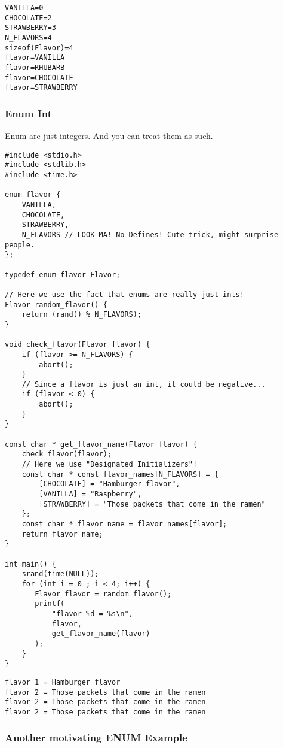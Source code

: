 \documentclass[11pt]{article}
\begin{document}
\begin{verbatim}
VANILLA=0
CHOCOLATE=2
STRAWBERRY=3
N_FLAVORS=4
sizeof(Flavor)=4
flavor=VANILLA
flavor=RHUBARB
flavor=CHOCOLATE
flavor=STRAWBERRY
\end{verbatim}

\subsubsection{Enum Int}
\label{sec:orgbb973ad}

Enum are just integers. And you can treat them as such.

\begin{verbatim}
#include <stdio.h>
#include <stdlib.h>
#include <time.h>

enum flavor {
    VANILLA,
    CHOCOLATE,
    STRAWBERRY,
    N_FLAVORS // LOOK MA! No Defines! Cute trick, might surprise people.
};

typedef enum flavor Flavor;

// Here we use the fact that enums are really just ints!
Flavor random_flavor() {
    return (rand() % N_FLAVORS);
}

void check_flavor(Flavor flavor) {
    if (flavor >= N_FLAVORS) {
        abort();
    }
    // Since a flavor is just an int, it could be negative...
    if (flavor < 0) {
        abort();
    }
}

const char * get_flavor_name(Flavor flavor) {
    check_flavor(flavor);
    // Here we use "Designated Initializers"!
    const char * const flavor_names[N_FLAVORS] = {
        [CHOCOLATE] = "Hamburger flavor",
        [VANILLA] = "Raspberry",
        [STRAWBERRY] = "Those packets that come in the ramen"
    };
    const char * flavor_name = flavor_names[flavor];
    return flavor_name;
}

int main() {
    srand(time(NULL));
    for (int i = 0 ; i < 4; i++) {
       Flavor flavor = random_flavor();
       printf(
           "flavor %d = %s\n",
           flavor,
           get_flavor_name(flavor)
       );
    }
}
\end{verbatim}

\begin{verbatim}
flavor 1 = Hamburger flavor
flavor 2 = Those packets that come in the ramen
flavor 2 = Those packets that come in the ramen
flavor 2 = Those packets that come in the ramen
\end{verbatim}

\subsubsection{Another motivating ENUM Example}
\label{sec:orgb479f83}
\end{document}
